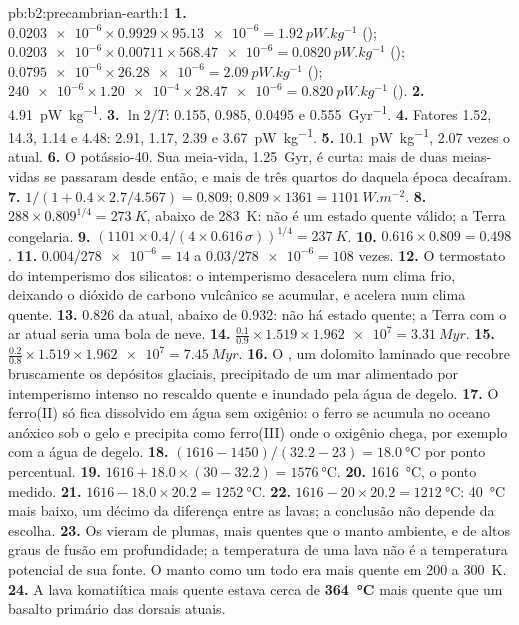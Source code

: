 \begin{solution}{pb:b2:precambrian-earth:1}
\textbf{1.} $\num{0.0203e-6}\times0.9929\times\num{95.13e-6} = \qty{1.92}{pW.kg^{-1}}$
(); $\num{0.0203e-6}\times0.00711\times\num{568.47e-6} = \qty{0.0820}{pW.kg^{-1}}$
(); $\num{0.0795e-6}\times\num{26.28e-6} = \qty{2.09}{pW.kg^{-1}}$ ();
$\num{240e-6}\times\num{1.20e-4}\times\num{28.47e-6} = \qty{0.820}{pW.kg^{-1}}$ ().
\textbf{2.} \qty{4.91}{pW.kg^{-1}}.
\textbf{3.} $\ln2/T$: 0.155, 0.985, 0.0495 e \qty{0.555}{Gyr^{-1}}.
\textbf{4.} Fatores 1.52, 14.3, 1.14 e 4.48: 2.91, 1.17, 2.39 e \qty{3.67}{pW.kg^{-1}}.
\textbf{5.} \qty{10.1}{pW.kg^{-1}}, 2.07 vezes o atual.
\textbf{6.} O potássio-40. Sua meia-vida, \qty{1.25}{Gyr}, é curta: mais de duas meias-vidas
se passaram desde então, e mais de três quartos do  daquela época decaíram.
\textbf{7.} $1/(1 + 0.4\times2.7/4.567) = 0.809$; $0.809\times1361 = \qty{1101}{W.m^{-2}}$.
\textbf{8.} $288\times0.809^{1/4} = \qty{273}{K}$, abaixo de \qty{283}{K}: não é um estado quente válido;
a Terra congelaria.
\textbf{9.} $(1101\times0.4/(4\times0.616\,\sigma))^{1/4} = \qty{237}{K}$.
\textbf{10.} $0.616\times0.809 = 0.498$.
\textbf{11.} $0.004/\num{278e-6} = 14$ a $0.03/\num{278e-6} = 108$ vezes.
\textbf{12.} O termostato do intemperismo dos silicatos: o intemperismo desacelera num clima frio, deixando
o dióxido de carbono vulcânico se acumular, e acelera num clima quente.
\textbf{13.} 0.826 da atual, abaixo de 0.932: não há estado quente; a Terra com o ar atual seria uma
bola de neve.
\textbf{14.} $\frac{0.1}{0.9}\times1.519\times\num{1.962e7} = \qty{3.31}{Myr}$.
\textbf{15.} $\frac{0.2}{0.8}\times1.519\times\num{1.962e7} = \qty{7.45}{Myr}$.
\textbf{16.} O , um dolomito laminado que recobre bruscamente os depósitos glaciais,
precipitado de um mar alimentado por intemperismo intenso no rescaldo quente e inundado pela
água de degelo.
\textbf{17.} O ferro(II) só fica dissolvido em água sem oxigênio: o ferro se acumula no
oceano anóxico sob o gelo e precipita como ferro(III) onde o oxigênio chega, por exemplo com a
água de degelo.
\textbf{18.} $(1616 - 1450)/(32.2 - 23) = \qty{18.0}{\celsius}$ por ponto percentual.
\textbf{19.} $1616 + 18.0\times(30 - 32.2) = \qty{1576}{\celsius}$.
\textbf{20.} \qty{1616}{\celsius}, o ponto medido.
\textbf{21.} $1616 - 18.0\times20.2 = \qty{1252}{\celsius}$.
\textbf{22.} $1616 - 20\times20.2 = \qty{1212}{\celsius}$: \qty{40}{\celsius} mais baixo, um décimo
da diferença entre as lavas; a conclusão não depende da escolha.
\textbf{23.} Os  vieram de plumas, mais quentes que o manto ambiente, e de altos graus de
fusão em profundidade; a temperatura de uma lava não é a temperatura potencial de sua fonte. O
manto como um todo era mais quente em 200 a \qty{300}{K}.
\textbf{24.} A lava komatiítica mais quente estava cerca de \textbf{\qty{364}{\celsius}} mais quente que um
basalto primário das dorsais atuais.
\end{solution}
